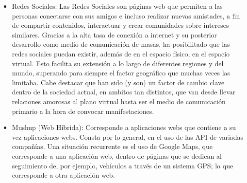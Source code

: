 \begin{itemize}
 
 \item Redes Sociales: Las Redes Sociales son páginas web que permiten a las personas conectarse con sus amigos e incluso realizar 
  nuevas amistades, a fin de compartir contenidos, interactuar y crear comunidades sobre intereses similares.
  Gracias a la alta tasa de conexión a internet y su posterior desarrollo como medio de comunicación de masas, ha posibilitado que las 
  redes sociales puedan existir, además de en el espacio físico, en el espacio virtual. Esto facilita su extensión a lo largo de 
  diferentes regiones y del mundo, superando para siempre el factor geográfico que muchas veces las limitaba.
  Cabe destacar que han sido (y son) un factor de cambio clave dentro de la sociedad actual, en ambitos tan distintos, que van desde 
  llevar relaciones amorosas al plano virtual hasta ser el medio de comunicación primario a la hora de convocar manifestaciones.
 
 \item Mushup (Web Híbrida): Corresponde a aplicaciones webs que contiene a su vez aplicaciones webs. Consta por lo general, en el uso
 de las API de variadas compañías. Una situación recurrente es el uso de Google Maps, que corresponde a una aplicación web, dentro de páginas
 que se dedican al seguimiento de, por ejemplo, vehículos a través de un sistema GPS; lo que corresponde a otra aplicación web.
 

\end{itemize}
